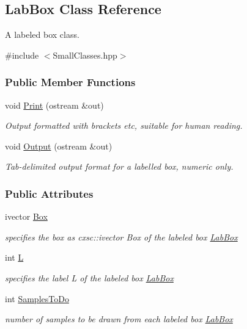 \hypertarget{classLabBox}{\subsection{\-Lab\-Box \-Class \-Reference}
\label{classLabBox}
}


\-A labeled box class.  




{\ttfamily \#include $<$\-Small\-Classes.\-hpp$>$}

\subsubsection*{\-Public \-Member \-Functions}
\begin{DoxyCompactItemize}
\item 
void \hyperlink{classLabBox_a93f97cf6932b8caf8911a0cf440807e6}{\-Print} (ostream \&out)
\begin{DoxyCompactList}\small\item\em \-Output formatted with brackets etc, suitable for human reading. \end{DoxyCompactList}\item 
void \hyperlink{classLabBox_a1bed774c2eb23a4b94b2a9934610faea}{\-Output} (ostream \&out)
\begin{DoxyCompactList}\small\item\em \-Tab-\/delimited output format for a labelled box, numeric only. \end{DoxyCompactList}\end{DoxyCompactItemize}
\subsubsection*{\-Public \-Attributes}
\begin{DoxyCompactItemize}
\item 
ivector \hyperlink{classLabBox_a65253d570e3236bde747ddfabc7c6849}{\-Box}
\begin{DoxyCompactList}\small\item\em specifies the box as cxsc\-::ivector \-Box of the labeled box \hyperlink{classLabBox}{\-Lab\-Box} \end{DoxyCompactList}\item 
int \hyperlink{classLabBox_a4f0197d8aaeb58676d6c50f0f229a63b}{\-L}
\begin{DoxyCompactList}\small\item\em specifies the label \-L of the labeled box \hyperlink{classLabBox}{\-Lab\-Box} \end{DoxyCompactList}\item 
int \hyperlink{classLabBox_a54c51c9c9300c28e166fac122b2bd9a9}{\-Samples\-To\-Do}
\begin{DoxyCompactList}\small\item\em number of samples to be drawn from each labeled box \hyperlink{classLabBox}{\-Lab\-Box} \end{DoxyCompactList}\end{DoxyCompactItemize}


